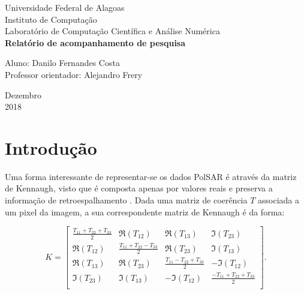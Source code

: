 \documentclass[12pt]{article}
\begin{document}

\onehalfspacing

\begin{titlepage}
	\begin{center}

		\Huge{Universidade Federal de Alagoas}\\
		\large{Instituto de Computação}\\ 
		\large{Laboratório de Computação Científica e Análise Numérica}\\ 
        \vspace{220pt}
        \textbf{\LARGE{Relatório de acompanhamento de pesquisa}}\\
		\vspace{3,5cm}
	\end{center}
	
	\begin{flushleft}
		\begin{tabbing}
			Aluno: Danilo Fernandes Costa\\
			Professor orientador: Alejandro Frery\\
	\end{tabbing}
 \end{flushleft}
	\vspace{1cm}
	
	\begin{center}
		\vspace{\fill}
			 Dezembro\\
		 2018
			\end{center}
\end{titlepage}

\section{Introdução}

Uma forma interessante de representar-se os dados PolSAR é através da matriz de Kennaugh, visto que é composta apenas por valores reais e preserva a informação de retroespalhamento \cite{ClassificationPolSARGeodesic}. Dada uma matriz de coerência $T$ associada a um pixel da imagem, a sua correspondente matriz de Kennaugh é da forma:

\[K =
\begin{bmatrix}

\frac{ T_{11} + T_{22} + T_{33} }{2} & \Re(T_{12}) & \Re(T_{13}) & \Im(T_{23})\\
\Re(T_{12}) & \frac{T_{11} + T_{22} - T_{33}}{2} & \Re(T_{23}) & \Im(T_{13})\\
\Re(T_{13}) & \Re(T_{23}) & \frac{ T_{11} - T_{22} + T_{33} }{2} & -\Im(T_{12})\\
\Im(T_{23}) & \Im(T_{13}) & -\Im(T_{12}) & \frac{ -T_{11} + T_{22} + T_{33} }{2}\\

\end{bmatrix}
.\]
\end{document}
